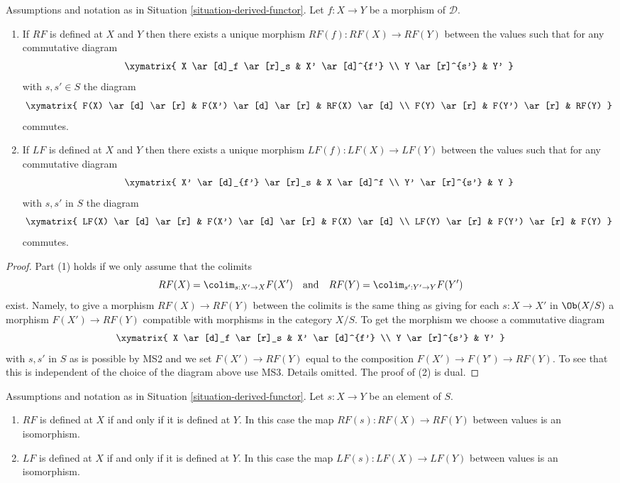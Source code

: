 \begin{lemma}
\label{lemma-derived-functor}
Assumptions and notation as in
Situation \ref{situation-derived-functor}.
Let $f : X \to Y$ be a morphism of $\mathcal{D}$.
\begin{enumerate}
\item If $RF$ is defined at $X$ and $Y$ then there exists a unique
morphism $RF(f) : RF(X) \to RF(Y)$ between the values such that
for any commutative diagram
$$
\xymatrix{
X \ar[d]_f \ar[r]_s & X' \ar[d]^{f'} \\
Y \ar[r]^{s'} & Y'
}
$$
with $s, s' \in S$ the diagram
$$
\xymatrix{
F(X) \ar[d] \ar[r] & F(X') \ar[d] \ar[r] & RF(X) \ar[d] \\
F(Y) \ar[r] & F(Y') \ar[r] & RF(Y)
}
$$
commutes.
\item If $LF$ is defined at $X$ and $Y$ then there exists a unique
morphism $LF(f) : LF(X) \to LF(Y)$ between the values such that
for any commutative diagram
$$
\xymatrix{
X' \ar[d]_{f'} \ar[r]_s & X \ar[d]^f \\
Y' \ar[r]^{s'} & Y
}
$$
with $s, s'$ in $S$ the diagram
$$
\xymatrix{
LF(X) \ar[d] \ar[r] & F(X') \ar[d] \ar[r] & F(X) \ar[d] \\
LF(Y) \ar[r] & F(Y') \ar[r] & F(Y)
}
$$
commutes.
\end{enumerate}
\end{lemma}

\begin{proof}
Part (1) holds if we only assume that the colimits
$$
RF(X) = \colim_{s : X' \to X} F(X')
\quad\text{and}\quad
RF(Y) = \colim_{s' : Y' \to Y} F(Y')
$$
exist. Namely, to give a morphism $RF(X) \to RF(Y)$ between the colimits
is the same thing as giving for each $s : X \to X'$ in $\Ob(X/S)$
a morphism $F(X') \to RF(Y)$ compatible with morphisms in the category
$X/S$. To get the morphism we choose a commutative diagram
$$
\xymatrix{
X \ar[d]_f \ar[r]_s & X' \ar[d]^{f'} \\
Y \ar[r]^{s'} & Y'
}
$$
with $s, s'$ in $S$ as is possible by MS2 and we set
$F(X') \to RF(Y)$ equal to the composition $F(X') \to F(Y') \to RF(Y)$.
To see that this is independent of the choice of the diagram above use
MS3. Details omitted. The proof of (2) is dual.
\end{proof}

\begin{lemma}
\label{lemma-derived-inverts}
Assumptions and notation as in
Situation \ref{situation-derived-functor}.
Let $s : X \to Y$ be an element of $S$.
\begin{enumerate}
\item $RF$ is defined at $X$ if and only if it is defined at $Y$.
In this case the map $RF(s) : RF(X) \to RF(Y)$ between values
is an isomorphism.
\item $LF$ is defined at $X$ if and only if it is defined at $Y$.
In this case the map $LF(s) : LF(X) \to LF(Y)$ between values
is an isomorphism.
\end{enumerate}
\end{lemma}

